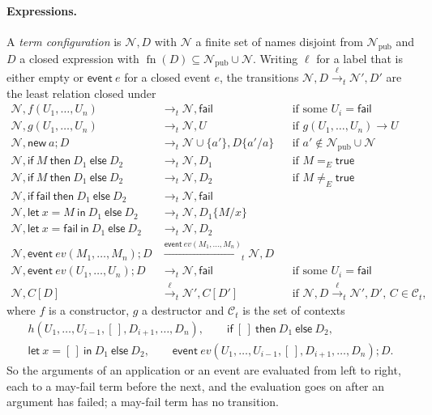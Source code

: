 \documentclass[11pt]{article}
\theoremstyle{definition}
\theoremstyle{plain}
\theoremstyle{remark}
\newcommand{\fn}{\operatorname{fn}}
\begin{document}
\paragraph{Expressions.} A \emph{term configuration} is $\mathcal{N},D$ with $\mathcal{N}$ a finite set of names disjoint from $\mathcal{N}_{\mathrm{pub}}$ and $D$ a closed expression with $\fn(D)\subseteq\mathcal{N}_{\mathrm{pub}}\cup\mathcal{N}$. Writing $\ell$ for a label that is either empty or $\mathsf{event}\ e$ for a closed event $e$, the transitions $\mathcal{N},D\xrightarrow{\ell}_t\mathcal{N}',D'$ are the least relation closed under
\begin{align*}
\mathcal{N},f(U_1,\dots,U_n)&\to_t\mathcal{N},\mathsf{fail} &&\text{if some }U_i=\mathsf{fail}\\
\mathcal{N},g(U_1,\dots,U_n)&\to_t\mathcal{N},U &&\text{if }g(U_1,\dots,U_n)\to U\\
\mathcal{N},\mathsf{new}\ a;D&\to_t\mathcal{N}\cup\{a'\},D\{a'/a\} &&\text{if }a'\notin\mathcal{N}_{\mathrm{pub}}\cup\mathcal{N}\\
\mathcal{N},\mathsf{if}\ M\ \mathsf{then}\ D_1\ \mathsf{else}\ D_2&\to_t\mathcal{N},D_1 &&\text{if }M=_E\mathsf{true}\\
\mathcal{N},\mathsf{if}\ M\ \mathsf{then}\ D_1\ \mathsf{else}\ D_2&\to_t\mathcal{N},D_2 &&\text{if }M\ne_E\mathsf{true}\\
\mathcal{N},\mathsf{if}\ \mathsf{fail}\ \mathsf{then}\ D_1\ \mathsf{else}\ D_2&\to_t\mathcal{N},\mathsf{fail}\\
\mathcal{N},\mathsf{let}\ x=M\ \mathsf{in}\ D_1\ \mathsf{else}\ D_2&\to_t\mathcal{N},D_1\{M/x\}\\
\mathcal{N},\mathsf{let}\ x=\mathsf{fail}\ \mathsf{in}\ D_1\ \mathsf{else}\ D_2&\to_t\mathcal{N},D_2\\
\mathcal{N},\mathsf{event}\ ev(M_1,\dots,M_n);D&\xrightarrow{\mathsf{event}\ ev(M_1,\dots,M_n)}_t\mathcal{N},D\\
\mathcal{N},\mathsf{event}\ ev(U_1,\dots,U_n);D&\to_t\mathcal{N},\mathsf{fail} &&\text{if some }U_i=\mathsf{fail}\\
\mathcal{N},C[D]&\xrightarrow{\ell}_t\mathcal{N}',C[D'] &&\text{if }\mathcal{N},D\xrightarrow{\ell}_t\mathcal{N}',D'\text{, }C\in\mathcal{C}_t,
\end{align*}
where $f$ is a constructor, $g$ a destructor and $\mathcal{C}_t$ is the set of contexts
\begin{gather*}
h(U_1,\dots,U_{i-1},[\,],D_{i+1},\dots,D_n),\qquad
\mathsf{if}\ [\,]\ \mathsf{then}\ D_1\ \mathsf{else}\ D_2,\\
\mathsf{let}\ x=[\,]\ \mathsf{in}\ D_1\ \mathsf{else}\ D_2,\qquad
\mathsf{event}\ ev(U_1,\dots,U_{i-1},[\,],D_{i+1},\dots,D_n);D.
\end{gather*}
So the arguments of an application or an event are evaluated from left to right, each to a may-fail term before the next, and the evaluation goes on after an argument has failed; a may-fail term has no transition.
\end{document}
